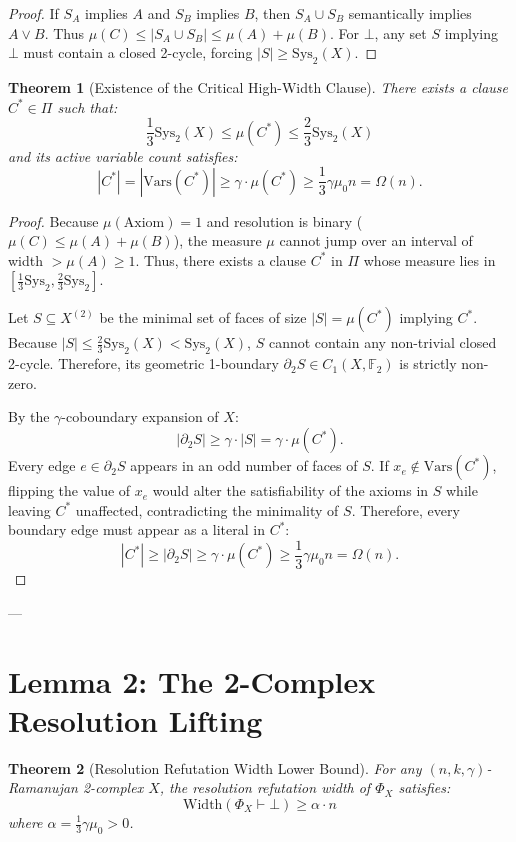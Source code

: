 \documentclass[11pt,a4paper]{article}
\theoremstyle{plain}
\newtheorem{theorem}{Theorem}[section]
\theoremstyle{definition}
\theoremstyle{remark}
\newcommand{\Width}{\mathrm{Width}}
\newcommand{\Vars}{\mathrm{Vars}}
\begin{document}
\begin{proof}
If $S_A$ implies $A$ and $S_B$ implies $B$, then $S_A \cup S_B$ semantically implies $A \lor B$. Thus $\mu(C) \le |S_A \cup S_B| \le \mu(A) + \mu(B)$. For $\bot$, any set $S$ implying $\bot$ must contain a closed 2-cycle, forcing $|S| \ge \mathrm{Sys}_2(X)$.
\end{proof}

\begin{theorem}[Existence of the Critical High-Width Clause]\label{thm:critical_clause}
There exists a clause $C^* \in \Pi$ such that:
\[
\frac{1}{3} \mathrm{Sys}_2(X) \le \mu(C^*) \le \frac{2}{3} \mathrm{Sys}_2(X)
\]
and its active variable count satisfies:
\[
|C^*| = |\Vars(C^*)| \ge \gamma \cdot \mu(C^*) \ge \frac{1}{3} \gamma \mu_0 n = \Omega(n).
\]
\end{theorem}

\begin{proof}
Because $\mu(\mathrm{Axiom}) = 1$ and resolution is binary ($\mu(C) \le \mu(A) + \mu(B)$), the measure $\mu$ cannot jump over an interval of width $> \mu(A) \ge 1$. Thus, there exists a clause $C^*$ in $\Pi$ whose measure lies in $[\frac{1}{3} \mathrm{Sys}_2, \frac{2}{3} \mathrm{Sys}_2]$.

Let $S \subseteq X^{(2)}$ be the minimal set of faces of size $|S| = \mu(C^*)$ implying $C^*$. 
Because $|S| \le \frac{2}{3} \mathrm{Sys}_2(X) < \mathrm{Sys}_2(X)$, $S$ cannot contain any non-trivial closed 2-cycle. 
Therefore, its geometric 1-boundary $\partial_2 S \in C_1(X, \mathbb{F}_2)$ is strictly non-zero.

By the $\gamma$-coboundary expansion of $X$:
\[
|\partial_2 S| \ge \gamma \cdot |S| = \gamma \cdot \mu(C^*).
\]
Every edge $e \in \partial_2 S$ appears in an odd number of faces of $S$. If $x_e \notin \Vars(C^*)$, flipping the value of $x_e$ would alter the satisfiability of the axioms in $S$ while leaving $C^*$ unaffected, contradicting the minimality of $S$. Therefore, every boundary edge must appear as a literal in $C^*$:
\[
|C^*| \ge |\partial_2 S| \ge \gamma \cdot \mu(C^*) \ge \frac{1}{3} \gamma \mu_0 n = \Omega(n).
\]
\end{proof}

---

\section{Lemma 2: The 2-Complex Resolution Lifting}

\begin{theorem}[Resolution Refutation Width Lower Bound]\label{thm:width_bound}
For any $(n, k, \gamma)$-Ramanujan 2-complex $X$, the resolution refutation width of $\Phi_X$ satisfies:
\[
\Width(\Phi_X \vdash \bot) \ge \alpha \cdot n
\]
where $\alpha = \frac{1}{3} \gamma \mu_0 > 0$.
\end{theorem}
\end{document}
